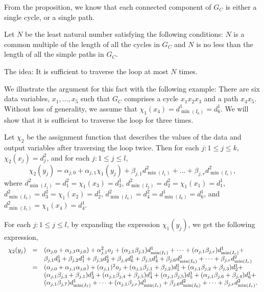 \documentclass[runningheads,a4paper]{llncs}
\begin{document}
From the proposition, we know that each connected component of $G_C$ is either a single cycle, or a single path.

Let $N$ be the least natural number satisfying the following conditions: $N$ is a common multiple of the length of all the cycles in $G_C$ and $N$ is no less than the length of all the simple paths in $G_C$.

\smallskip

The idea: It is sufficient to traverse the loop at most $N$ times.

We illustrate the argument for this fact with the following example: There are six data variables, $x_1,\dots,x_5$ such that  $G_C$ comprises a cycle $x_1x_2x_3$ and a path $x_4 x_5$. Without loss of generality, we assume that $\chi_1(x_4)=d^1_{\min(I_6)}=d^1_6$. We will show that it is sufficient to traverse the loop for three times.

Let $\chi_2$ be the assignment function that describes the values of the data and output variables after traversing the loop twice. Then for each $j: 1 \le j \le k$, $\chi_2(x_j)=d^2_j$, and for each $j: 1 \le j \le l$, 
\[\chi_2(y_j) = \alpha_{j,0} + \alpha_{j,1} \chi_1(y_j) + \beta_{j,1} d^2_{\min(I_1)} + \dots + \beta_{j,r} d^2_{\min(I_r)},\]
where $d^2_{\min(I_1)}=d^2_1 = \chi_1(x_3)=d^1_3$, $d^2_{\min(I_2)}=d^2_2 = \chi_1(x_1)=d^1_1$, $d^2_{\min(I_3)}=d^2_3 = \chi_1(x_2)=d^1_2$, $d^2_{\min(I_4)}=d^2_4 = d^1_{\min(I_6)}=d^1_6$, and $d^2_{\min(I_5)}=\chi_1(x_4)=d^1_4$.

For each $j: 1 \le j \le l$, 
by expanding the expression $\chi_1(y_j)$, we  get the following expression, 
\[
\begin{array}{l c l}
\chi_2(y_j) & = & (\alpha_{j,0} + \alpha_{j,1} \alpha_{j,0}) + \alpha^2_{j,1} o_j + (\alpha_{j,1} \beta_{j,1}) d^1_{\min(I_1)} +  \dots + (\alpha_{j,1} \beta_{j,r}) d^1_{\min(I_r)} + \\
& &  \beta_{j,1} d^1_3 + \beta_{j,2} d^1_1 + \beta_{j,3} d^1_2 + \beta_{j,4} d^1_6 + \beta_{j,5} d^1_4 + \beta_{j,6} d^2_{\min(I_6)} + \dots + \beta_{j,r} d^2_{\min(I_r)}\\
& = & (\alpha_{j,0} + \alpha_{j,1} \alpha_{j,0}) + (\alpha_{j,1})^2 o_j + (\alpha_{j,1} \beta_{j,1} + \beta_{j,2}) d^1_1 + (\alpha_{j,1}\beta_{j,2}+\beta_{j,3})d^1_2+\\
& & (\alpha_{j,1}\beta_{j,3}+\beta_{j,1})d^1_3 +  (\alpha_{j,1}\beta_{j,4}+\beta_{j,5})d^1_4 + (\alpha_{j,1}\beta_{j,5})d^1_5 + (\alpha_{j,1}\beta_{j,6}+\beta_{j,4})d^1_6 + \\
& & (\alpha_{j,1}\beta_{j,7}) d^1_{\min(I_7)} + \dots + (\alpha_{j,1}\beta_{j,r}) d^1_{\min(I_r)} + \beta_{j,6} d^2_{\min(I_6)} + \dots + \beta_{j,r} d^2_{\min(I_r)}.
\end{array}
\] 
\end{document}
